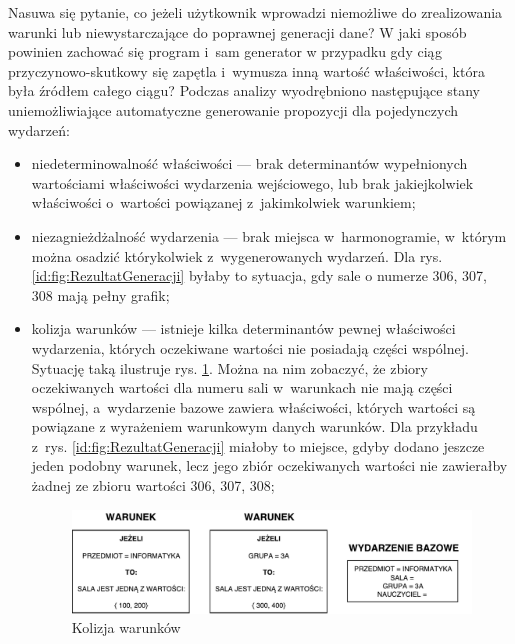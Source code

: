 \documentclass[a4paper]{book}
\begin{document}
Nasuwa się pytanie, co jeżeli użytkownik wprowadzi niemożliwe do zrealizowania warunki lub niewystarczające do poprawnej generacji dane? W jaki sposób powinien zachować się program i~sam generator w przypadku gdy ciąg przyczynowo-skutkowy się zapętla i~wymusza inną wartość właściwości, która była źródłem całego ciągu? Podczas analizy wyodrębniono następujące stany uniemożliwiające automatyczne generowanie propozycji dla pojedynczych wydarzeń:
\begin{itemize}
\item niedeterminowalność właściwości --- brak determinantów wypełnionych wartościami właściwości wydarzenia wejściowego, lub brak jakiejkolwiek właściwości o~wartości powiązanej z~jakimkolwiek warunkiem;
\item niezagnieżdżalność wydarzenia --- brak miejsca w~harmonogramie, w~którym można osadzić którykolwiek z~wygenerowanych wydarzeń. Dla rys. \ref{id:fig:RezultatGeneracji} byłaby to sytuacja, gdy sale o numerze 306, 307, 308 mają pełny grafik;
\item kolizja warunków --- istnieje kilka determinantów pewnej właściwości wydarzenia, których oczekiwane wartości nie posiadają części wspólnej. Sytuację taką ilustruje rys. \ref{id:fig:KolizjaWarunkow}. Można na nim zobaczyć, że zbiory oczekiwanych wartości dla numeru sali w~warunkach nie mają części wspólnej, a~wydarzenie bazowe zawiera właściwości, których wartości są powiązane z wyrażeniem warunkowym danych warunków. Dla przykładu z~rys. \ref{id:fig:RezultatGeneracji} miałoby to miejsce, gdyby dodano jeszcze jeden podobny warunek, lecz jego zbiór oczekiwanych wartości nie zawierałby żadnej ze zbioru wartości {306, 307, 308};
\begin{figure}
	\centering
	\includegraphics[width=1.0\textwidth]{./img/KolizjaWarunkow.pdf}
	\caption{Kolizja warunków}
	\label{id:fig:KolizjaWarunkow}
\end{figure}

\end{itemize}
\end{document}
